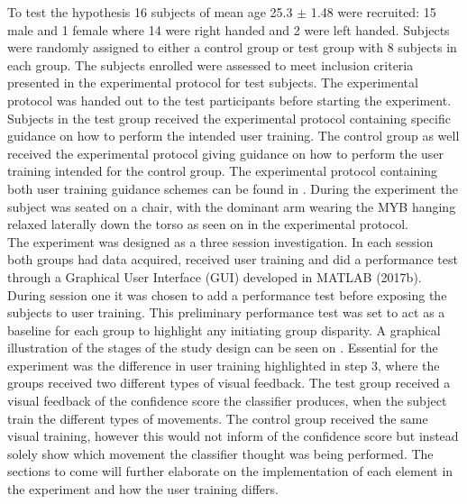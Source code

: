 To test the hypothesis 16 subjects of mean age 25.3 $\pm$ 1.48 were recruited: 15 male and 1 female where 14 were right handed and 2 were left handed. Subjects were randomly assigned to either a control group or test group with 8 subjects in each group. The subjects enrolled were assessed to meet inclusion criteria presented in the experimental protocol for test subjects. The experimental protocol was handed out to the test participants before starting the experiment. Subjects in the test group received the experimental protocol containing specific guidance on how to perform the intended user training. The control group as well received the experimental protocol giving guidance on how to perform the user training intended for the control group. The experimental protocol containing both user training guidance schemes can be found in . During the experiment the subject was seated on a chair, with the dominant arm wearing the MYB hanging relaxed laterally down the torso as seen on  in the experimental protocol. \\
The experiment was designed as a three session investigation. In each session both groups had data acquired, received user training and did a performance test through a Graphical User Interface (GUI) developed in MATLAB (2017b). During session one it was chosen to add a performance test before exposing the subjects to user training. This preliminary performance test was set to act as a baseline for each group to highlight any initiating group disparity. A graphical illustration of the stages of the study design can be seen on . Essential for the experiment was the difference in user training highlighted in step 3, where the groups received two different types of visual feedback. The test group received a visual feedback of the confidence score the classifier produces, when the subject train the different types of movements. The control group received the same visual training, however this would not inform of the confidence score but instead solely show which movement the classifier thought was being performed. The sections to come will further elaborate on the implementation of each element in the experiment and how the user training differs.  

